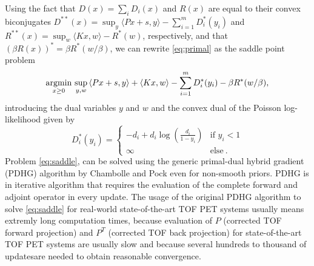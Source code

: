 Using the fact that $D(x) = \sum_i D_i(x)$ and $R(x)$ are equal to their convex biconjugates 
$D^{**}(x) = \sup_y \langle Px + s, y \rangle - \sum_{i=1}^{m} D_i^*(y_i)$ 
and $R^{**}(x) = \sup_w \langle Kx, w \rangle - R^*(w)$, respectively, and that 
$(\beta R(x))^* = \beta R^*(w / \beta)$, we can rewrite \eqref{eq:primal} as the saddle point problem
%
\begin{equation}
\operatorname*{argmin} _{x\geq 0} \, \sup_{y,w} \,  \langle Px + s, y \rangle + \langle Kx, w \rangle - \sum_{i=1}^{m} D_i^*(y_i) - \beta R^*(w/\beta) ,
\label{eq:saddle}
\end{equation}
%
introducing the dual variables $y$ and $w$ and the convex dual of the Poisson log-likelihood given by
%
\begin{equation}
D_i^*(y_i) =
\begin{cases}
-d_i + d_i \log \left( \frac{d_i}{1-y_i} \right) & \text{if } y_i < 1 \\
\infty & \text{else} \ .
\end{cases}
\end{equation}
%
Problem \eqref{eq:saddle}, can be solved using the generic primal-dual hybrid gradient (PDHG) 
algorithm by Chambolle and Pock \cite{Chambolle2011} even for non-smooth priors.
PDHG is in iterative algorithm that requires the evaluation of the complete forward and adjoint operator
in every update.
The usage of the original PDHG algorithm to solve \eqref{eq:saddle} for real-world state-of-the-art
TOF PET systems usually means extremly long computation times, because evaluation of $P$ (corrected TOF 
forward projection) and $P^T$ (corrected TOF back projection) 
for state-of-the-art TOF PET systems are usually slow and because several hundreds to thousand of updatesare needed to obtain reasonable convergence.

